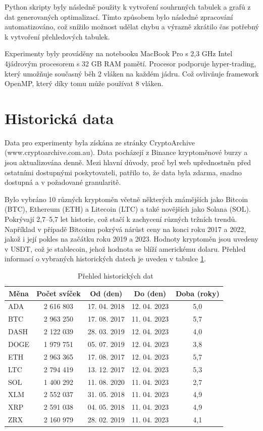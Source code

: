 Python skripty byly následně použity k vytvoření souhrnných tabulek a grafů z dat generovaných optimalizací.
Tímto způsobem bylo následné zpracování automatizováno, což snížilo možnost udělat chybu a výrazně zkrátilo čas potřebný k vytvoření přehledových tabulek.

Experimenty byly prováděny na notebooku MacBook Pro s 2,3 GHz Intel 4jádrovým procesorem s 32 GB RAM pamětí.
Procesor podporuje hyper-trading, který umožňuje současný běh 2 vláken na každém jádru.
Což ovlivňuje framework OpenMP, který díky tomu může používat 8 vláken.

\section{Historická data}
Data pro experimenty byla získána ze stránky CryptoArchive (www.cryptoarchive.com.au).
Data pocházejí z Binance kryptoměnové burzy a jsou aktualizována denně.
Mezi hlavní důvody, proč byl web upřednostněn před ostatními dostupnými poskytovateli, patřilo to, že data byla zdarma, snadno dostupná a v požadované granularitě.

Bylo vybráno 10 různých kryptoměn včetně některých známějších jako Bitcoin (BTC), Ethereum (ETH) a Litecoin (LTC) a také novějších jako Solana (SOL).
Pokrývají 2,7--5,7 let historie, což stačí k zachycení různých tržních trendů.
Například v případě Bitcoinu pokrývá nárůst ceny na konci roku 2017 a 2022, jakož i její pokles na začátku roku 2019 a 2023.
Hodnoty kryptoměn jsou uvedeny v USDT, což je stablecoin, jehož hodnota se blíží americkému dolaru.
Přehled informací o vybraných historických datech je uveden v tabulce \ref{tab:historical:market:data}.

\begin{table}[!htbp]
\centering
\centering
\caption[Přehled historických dat]{~Přehled historických dat}\label{tab:historical:market:data}
{%
\begin{tabular}{|l|c|c|c|c|}
\hline
\multicolumn{1}{|c|}{\textbf{Měna}} & \textbf{Počet svíček} & \textbf{Od (den)} & \textbf{Do (den)} & \textbf{Doba (roky)} \\ \hline
ADA  & 2 616 803 & 17. 04. 2018 & 12. 04. 2023 & 5,0 \\ \hline
BTC  & 2 963 250 & 17. 08. 2017 & 11. 04. 2023 & 5,7 \\ \hline
DASH & 2 122 039 & 28. 03. 2019 & 12. 04. 2023 & 4,0 \\ \hline
DOGE & 1 979 751 & 05. 07. 2019 & 12. 04. 2023 & 3,8 \\ \hline
ETH  & 2 963 365 & 17. 08. 2017 & 12. 04. 2023 & 5,7 \\ \hline
LTC  & 2 794 419 & 13. 12. 2017 & 12. 04. 2023 & 5,3 \\ \hline
SOL  & 1 400 292 & 11. 08. 2020 & 11. 04. 2023 & 2,7 \\ \hline
XLM  & 2 552 037 & 31. 05. 2018 & 11. 04. 2023 & 4,9 \\ \hline
XRP  & 2 591 038 & 04. 05. 2018 & 11. 04. 2023 & 4,9 \\ \hline
ZRX  & 2 160 979 & 28. 02. 2019 & 11. 04. 2023 & 4,1 \\ \hline
\end{tabular}%
}
\end{table}

